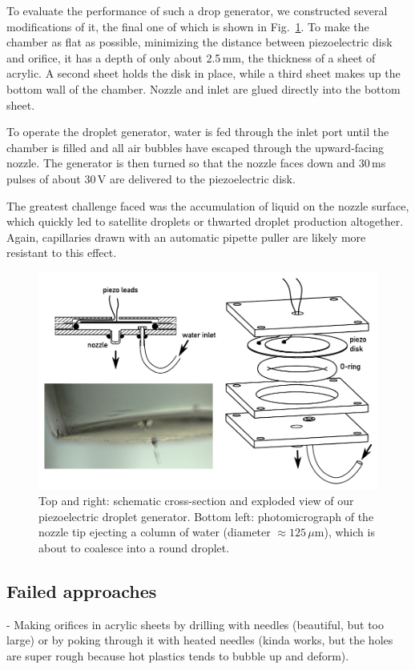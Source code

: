 \documentclass[11.5pt]{book}
\begin{document}
To evaluate the performance of such a drop generator, we constructed several
modifications of it, the final one of which is shown in Fig.~\ref{fig:flatyang}.
To make the chamber as flat as possible, minimizing the distance between
piezoelectric disk and orifice, it has a depth of only about 2.5$\,$mm, the
thickness of a sheet of acrylic. A second sheet holds the disk in place, while a
third sheet makes up the bottom wall of the chamber. Nozzle and inlet are glued
directly into the bottom sheet.

To operate the droplet generator, water is fed through
the inlet port until the chamber is filled and all air bubbles have escaped
through the upward-facing nozzle. The generator is then turned so that the nozzle
faces down and $30\,$ms pulses of about $30\,$V are delivered to the
piezoelectric disk.

The greatest challenge faced was the accumulation of liquid on the nozzle
surface, which quickly led to satellite droplets or thwarted droplet production
altogether. Again, capillaries drawn with an automatic pipette puller are likely
more resistant to this effect.

\begin{figure}
\centering
\includegraphics[width=\textwidth]{img/setup/flatyang_exploded.pdf}
\caption{Top and right: schematic cross-section and exploded view of our
    piezoelectric droplet generator. Bottom left: photomicrograph of the nozzle
    tip ejecting a column of water (diameter $\approx 125\,\mu$m), which is about to coalesce into a
round droplet. \label{fig:flatyang}}
\end{figure}

\subsection{Failed approaches}
- Making orifices in acrylic sheets by drilling with needles (beautiful, but too
large) or by poking through it with heated needles (kinda works, but the holes
are super rough because hot plastics tends to bubble up and deform).
\end{document}
